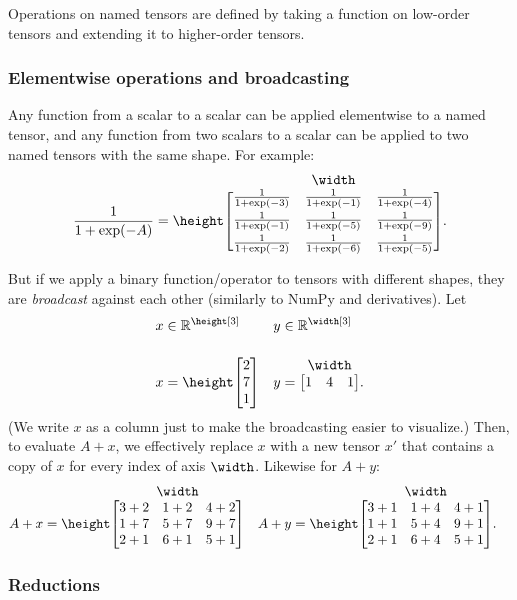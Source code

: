\documentclass{article}
\makeatletter
\newcommand{\nmatrix}[3]{#1\begin{array}[b]{@{}c@{}}#2\\\begin{bmatrix}#3\end{bmatrix}\end{array}}
\newcommand{\reals}{\mathbb{R}}
\makeatother
\begin{document}
Operations on named tensors are defined by taking a function on low-order tensors and extending it to higher-order tensors.

\subsubsection{Elementwise operations and broadcasting}

Any function from a scalar to a scalar can be applied elementwise to a named tensor, and any function from two scalars to a scalar can be applied to two named tensors with the same shape. For example:
\begin{equation*}
\frac1{1+\exp(-A)} = \nmatrix{\height}{\width}{
  \frac1{1+\exp(-3)} & \frac1{1+\exp(-1)} & \frac1{1+\exp(-4)} \\[1ex]
  \frac1{1+\exp(-1)} & \frac1{1+\exp(-5)} & \frac1{1+\exp(-9)} \\[1ex]
  \frac1{1+\exp(-2)} & \frac1{1+\exp(-6)} & \frac1{1+\exp(-5)}
}.
\end{equation*}

But if we apply a binary function/operator to tensors with different shapes, they are \emph{broadcast} against each other (similarly to NumPy and derivatives). Let
\begin{align*}
  x &\in \reals^{\height[3]} & y &\in \reals^{\width[3]} \\
  x &= \nmatrix{\height}{}{
    2 \\ 7 \\ 1
  } & 
  y &= \nmatrix{}{\width}{
    1 & 4 & 1
  }.
\end{align*}
(We write $x$ as a column just to make the broadcasting easier to visualize.) Then, to evaluate $A+x$, we effectively replace $x$ with a new tensor $x'$ that contains a copy of $x$ for every index of axis $\width$. Likewise for $A+y$:
\begin{align*}
A + x &= \nmatrix{\height}{\width}{
  3+2 & 1+2 & 4+2 \\
  1+7 & 5+7 & 9+7 \\
  2+1 & 6+1 & 5+1
} &
A + y &= \nmatrix{\height}{\width}{
  3+1 & 1+4 & 4+1 \\
  1+1 & 5+4 & 9+1 \\
  2+1 & 6+4 & 5+1
}.
\end{align*}

\subsubsection{Reductions}
\label{sec:reductions}
\end{document}

